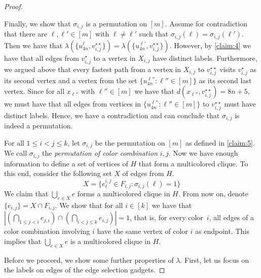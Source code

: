 \documentclass[a4paper,UKenglish,cleveref, autoref, thm-restate, anonymous]{lipics-v2021}
\begin{document}
\begin{proof}
\begin{claimproof}
    Finally, we show that $\sigma_{i,j}$ is a permutation on $[m]$. Assume for contradiction that there are $\ell,\ell'\in[m]$ with $\ell\neq \ell'$ such that $\sigma_{i,j}(\ell)=\sigma_{i,j}(\ell')$. Then we have that $\lambda(\{u^{\ell}_{4n},v_{i,j}^{\star\star}\})=\lambda(\{u^{\ell'}_{4n},v_{i,j}^{\star\star}\})$. However, by \cref{claim:4} we have that all edges from $v_{i,j}^\star$ to a vertex in $X_{i,j}$ have distinct labels. Furthermore, we argued above that every fastest path from a vertex in $X_{i,j}$ to $v_{i,j}^{\star\star}$ visits $v_{i,j}^\star$ as its second vertex and a vertex from the set $\{u^{\ell''}_{4n} :  \ell''\in[m]\}$ as its second last vertex. Since for all $x_{\ell''}$ with $\ell''\in[m]$ we have that $d(x_{\ell''},v_{i,j}^{\star\star})=8n+5$, we must have that all edges from vertices in $\{u^{\ell''}_{4n} :  \ell''\in[m]\}$ to $v_{i,j}^{\star\star}$ must have distinct labels. Hence, we have a contradiction and can conclude that $\sigma_{i,j}$ is indeed a permutation.
\end{claimproof}

For all $1\le i<j\le k$, let $\sigma_{i,j}$ be the permutation on $[m]$ as defined in \cref{claim:5}. We call $\sigma_{i,j}$ the \emph{permutation of color combination $i,j$}. 
Now we have enough information to define a set of vertices of $H$ that form a multicolored clique.
To this end, consider the following set $X$ of edges from $H$.
\[
X=\{e_\ell^{i,j}\in F_{i,j} :  \sigma_{i,j}(\ell)=1\}
\]
We claim that $\bigcup_{e\in X}e$ forms a multicolored clique in $H$.
From now on, denote $\{e_{i,j}\}=X\cap F_{i,j}$. We show that for all $i\in [k]$ we have that $|(\bigcap_{1\le j<i} e_{j,i}) \cap (\bigcap_{i<j\le k} e_{i,j})|=1$, that is, for every color~$i$, all edges of a color combination involving $i$ have the same vertex of color $i$ as endpoint. This implies that $\bigcup_{e\in X}e$ is a multicolored clique in $H$.

Before we proceed, we show some further properties of $\lambda$. First, let us focus on the labels on edges of the edge selection gadgets.


\end{proof}
\end{document}
